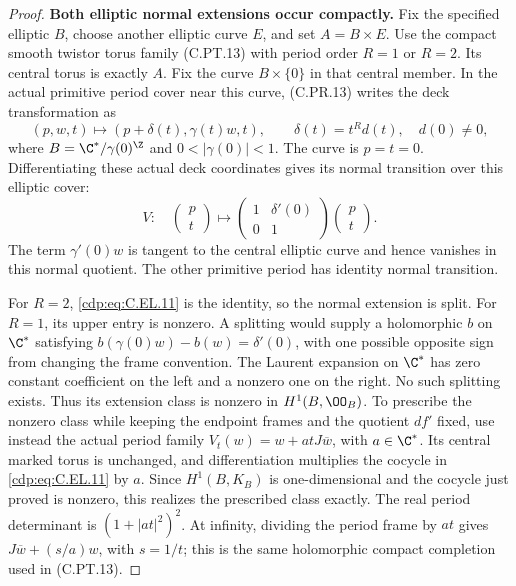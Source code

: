 \begin{proof}
\par\medskip\noindent\textbf{Both elliptic normal extensions occur compactly.}
Fix the specified elliptic $B$, choose another elliptic curve
$E$, and set $A=B\times E$. Use the compact smooth twistor
torus family (C.PT.13) with period order $R=1$ or $R=2$.
Its central torus is exactly $A$. Fix the curve $B\times\{0\}$
in that central member. In the actual primitive period cover
near this curve, (C.PR.13) writes the deck transformation as
\[
 (p,w,t)\longmapsto
       (p+\delta(t),\gamma(t)w,t),\qquad
 \delta(t)=t^R d(t),\quad d(0)\ne0,
                                                        \tag{C.EL.10}\label{cdp:eq:C.EL.10}
\]
where $B=\C^*/\gamma(0)^{\Z}$ and $0<|\gamma(0)|<1$.
The curve is $p=t=0$. Differentiating these actual deck
coordinates gives its normal transition over this elliptic
cover:
\[
 V:\quad
 \begin{pmatrix}p\\t\end{pmatrix}\longmapsto
 \begin{pmatrix}1&\delta'(0)\\0&1\end{pmatrix}
 \begin{pmatrix}p\\t\end{pmatrix}.
                                                        \tag{C.EL.11}\label{cdp:eq:C.EL.11}
\]
The term $\gamma'(0)w$ is tangent to the central elliptic
curve and hence vanishes in this normal quotient. The other
primitive period has identity normal transition.

For $R=2$, \eqref{cdp:eq:C.EL.11} is the identity, so the normal extension
is split. For $R=1$, its upper entry is nonzero. A splitting
would supply a holomorphic $b$ on $\C^*$ satisfying
$b(\gamma(0)w)-b(w)=\delta'(0)$, with one possible opposite
sign from changing the frame convention. The Laurent
expansion on $\C^*$ has zero constant coefficient on the
left and a nonzero one on the right. No such splitting
exists. Thus its extension class is nonzero in $H^1(B,\OO_B)$.
To prescribe the nonzero class while keeping the endpoint
frames and the quotient $df'$ fixed, use instead the actual
period family $V_t(w)=w+a tJ\overline w$, with $a\in\C^*$.
Its central marked torus is unchanged, and differentiation
multiplies the cocycle in \eqref{cdp:eq:C.EL.11} by $a$. Since
$H^1(B,K_B)$ is one-dimensional and the cocycle just proved
is nonzero, this realizes the prescribed class exactly.
The real period determinant is $(1+|at|^2)^2$. At infinity,
dividing the period frame by $at$ gives
$J\overline w+(s/a)w$, with $s=1/t$; this is the same
holomorphic compact completion used in (C.PT.13).


\end{proof}
